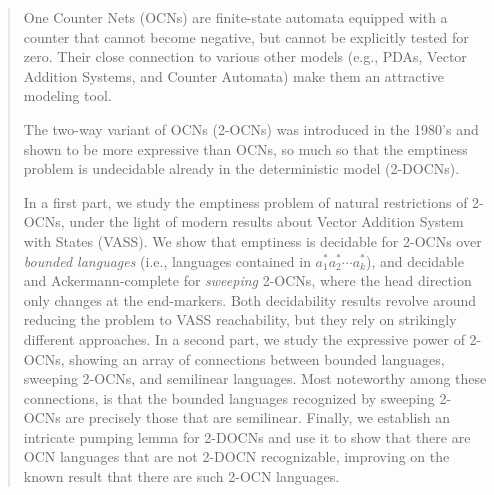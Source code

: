 \documentclass[11pt,a4paper]{amsart}
\theoremstyle{definition}
\begin{document}
	\begin{abstract}
		One Counter Nets (OCNs) are finite-state automata equipped with a counter that
		cannot become negative, but cannot be explicitly tested for zero. Their close
		connection to various other models (e.g., PDAs, Vector Addition Systems, and
		Counter Automata) make them an attractive modeling tool.
		
		The two-way variant of OCNs (2-OCNs) was introduced in the 1980's and shown to
		be more expressive than OCNs, so much so that the emptiness problem is
		undecidable already in the deterministic model (2-DOCNs).
		
		In a first part, we study the emptiness problem of natural restrictions of
		2-OCNs, under the light of modern results about Vector Addition System with
		States (VASS).  We show that emptiness is decidable for 2-OCNs over
		\emph{bounded languages} (i.e., languages contained in
		$a_1^*a_2^*\cdots a_k^*$), and decidable and Ackermann-complete for \emph{sweeping}
		2-OCNs, where the head direction only changes at the end-markers. Both
		decidability results revolve around reducing the problem to VASS reachability,
		but they rely on strikingly different approaches.  In a second part, we study
		the expressive power of 2-OCNs, showing an array of connections between
		bounded languages, sweeping 2-OCNs, and semilinear languages.  Most noteworthy
		among these connections, is that the bounded languages recognized by sweeping
		2-OCNs are precisely those that are semilinear. Finally, we establish an
		intricate pumping lemma for 2-DOCNs and use it to show that there are OCN
		languages that are not 2-DOCN recognizable, improving on the known result that
		there are such 2-OCN languages.
		
	\end{abstract}
\end{document}
